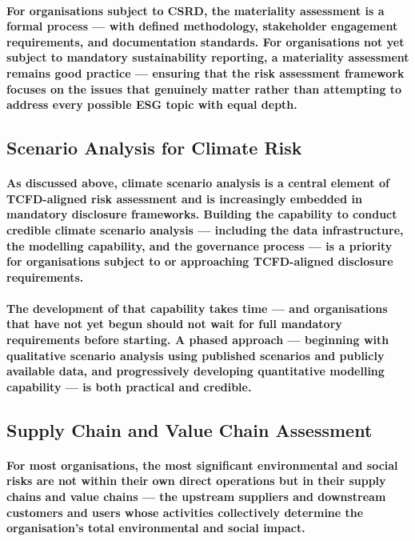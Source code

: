 \paragraph{For organisations subject to CSRD, the materiality assessment is a formal process — with defined methodology, stakeholder engagement requirements, and documentation standards. For organisations not yet subject to mandatory sustainability reporting, a materiality assessment remains good practice — ensuring that the risk assessment framework focuses on the issues that genuinely matter rather than attempting to address every possible ESG topic with equal depth.}

\subsection{Scenario Analysis for Climate Risk}
\paragraph{As discussed above, climate scenario analysis is a central element of TCFD-aligned risk assessment and is increasingly embedded in mandatory disclosure frameworks. Building the capability to conduct credible climate scenario analysis — including the data infrastructure, the modelling capability, and the governance process — is a priority for organisations subject to or approaching TCFD-aligned disclosure requirements.}
\paragraph{The development of that capability takes time — and organisations that have not yet begun should not wait for full mandatory requirements before starting. A phased approach — beginning with qualitative scenario analysis using published scenarios and publicly available data, and progressively developing quantitative modelling capability — is both practical and credible.}

\subsection{Supply Chain and Value Chain Assessment}
\paragraph{For most organisations, the most significant environmental and social risks are not within their own direct operations but in their supply chains and value chains — the upstream suppliers and downstream customers and users whose activities collectively determine the organisation's total environmental and social impact.}
